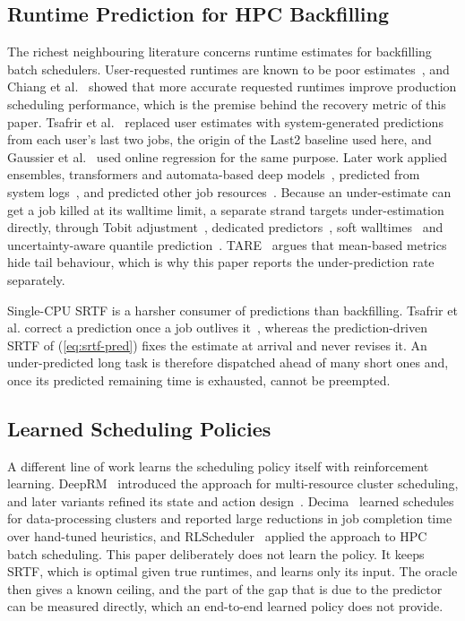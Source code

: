 \documentclass[conference]{IEEEtran}
\begin{document}
\subsection{Runtime Prediction for HPC Backfilling}
The richest neighbouring literature concerns runtime estimates for
backfilling batch schedulers. User-requested runtimes are known to be poor
estimates~\cite{lee_are_2004,lee_user_2006}, and Chiang et
al.~\cite{chiang_impact_2002} showed that more accurate requested runtimes
improve production scheduling performance, which is the premise behind the
recovery metric of this paper. Tsafrir et al.~\cite{tsafrir_backfilling_2007}
replaced user estimates with system-generated predictions from each user's
last two jobs, the origin of the Last2 baseline used here, and Gaussier et
al.~\cite{gaussier_improving_2015} used online regression for the same
purpose. Later work applied ensembles, transformers and automata-based deep
models~\cite{chen_runtime_2020,chen_job_2023,cheon_ared_2023}, predicted from
system logs~\cite{chen_predicting_2013}, and predicted other job
resources~\cite{tanash_improving_2019}. Because an under-estimate can get a
job killed at its walltime limit, a separate strand targets under-estimation
directly, through Tobit adjustment~\cite{fan_tobit_undated}, dedicated
predictors~\cite{unknown_machine_2017}, soft
walltimes~\cite{chlumsky_improving_2022} and uncertainty-aware quantile
prediction~\cite{unknown_uarp_2026}. TARE~\cite{xiao_tare_2026} argues that
mean-based metrics hide tail behaviour, which is why this paper reports the
under-prediction rate separately.

Single-CPU SRTF is a harsher consumer of predictions than backfilling.
Tsafrir et al. correct a prediction once a job outlives
it~\cite{tsafrir_backfilling_2007}, whereas the prediction-driven SRTF of
(\ref{eq:srtf-pred}) fixes the estimate at arrival and never revises it. An
under-predicted long task is therefore dispatched ahead of many short ones
and, once its predicted remaining time is exhausted, cannot be preempted.

\subsection{Learned Scheduling Policies}
A different line of work learns the scheduling policy itself with
reinforcement learning. DeepRM~\cite{mao_resource_2016} introduced the
approach for multi-resource cluster scheduling, and later variants refined
its state and action design~\cite{ye_new_undated,unknown_data_2020,domeniconi_cush_undated,cunha_impact_undated}.
Decima~\cite{mao_learning_2019} learned schedules for data-processing
clusters and reported large reductions in job completion time over
hand-tuned heuristics, and RLScheduler~\cite{zhang_rlscheduler_2020} applied
the approach to HPC batch scheduling. This paper deliberately does not learn
the policy. It keeps SRTF, which is optimal given true runtimes, and learns
only its input. The oracle then gives a known ceiling, and the part of the
gap that is due to the predictor can be measured directly, which an
end-to-end learned policy does not provide.
\end{document}
